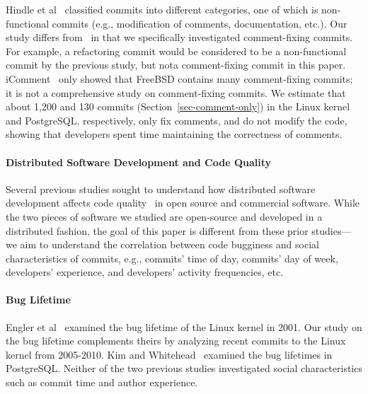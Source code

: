 Hindle et al~\cite{largeCommits} classified commits into different categories, one of which 
is non-functional commits (e.g., modification of comments, documentation, etc.).
Our study differs from~\cite{largeCommits} in that we specifically investigated
comment-fixing commits. For example, a refactoring commit 
would be considered to be a non-functional commit by the previous study, but nota comment-fixing commit in this paper. 
iComment~\cite{iComment} only showed that FreeBSD contains many comment-fixing commits; it is
not a comprehensive study on comment-fixing commits.  
We estimate that about 1,200 and 130 commits (Section~\ref{sec-comment-only}) %
in the Linux kernel and PostgreSQL, respectively, only fix comments, 
and do not modify the code, showing
that developers spent time maintaining the correctness of comments. 


\paragraph{Distributed Software Development and Code Quality}
Several previous studies sought to understand how distributed software development affects 
code quality~\cite{distributed09, organizational08, global06} in open source and commercial 
software. While the two pieces of software we studied are open-source and developed in a distributed fashion,  
the goal of this paper is different from these prior studies---we aim to understand the correlation
between code bugginess and social characteristics of commits, e.g., commits' time of day, commits' day 
of week, developers' experience, and developers' activity frequencies, etc. 

\paragraph{Bug Lifetime}
Engler et al~\cite{deviant} examined the bug lifetime of the Linux kernel in 2001. 
Our study on the bug lifetime complements theirs by analyzing recent commits to the Linux kernel from 2005-2010.
Kim and Whitehead~\cite{2006-long} examined the bug lifetimes in PostgreSQL.
Neither of the two previous studies investigated social characteristics such as commit time and author
experience. 



